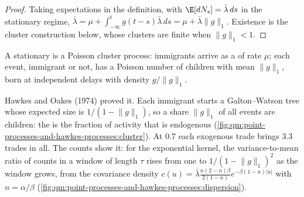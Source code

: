 \begin{proof}
Taking expectations in the definition, with $\E[dN_s] = \bar\lambda\,ds$ in the stationary regime,
$\bar\lambda = \mu + \int_{-\infty}^t g(t - s)\bar\lambda\,ds = \mu + \bar\lambda\lVert g\rVert_1$. Existence is the
cluster construction below, whose clusters are finite when $\lVert g\rVert_1 < 1$.
\end{proof}

\begin{theorem}\label{thm:qm:point-processes-and-hawkes-processes:cluster}
A stationary  is a Poisson cluster process: immigrants arrive as a  of rate
$\mu$; each event, immigrant or not, has a Poisson number of children with mean $\lVert g\rVert_1$, born at
independent delays with density $g/\lVert g\rVert_1$.
\end{theorem}

\admitted

Hawkes and Oakes (1974) proved it. Each immigrant starts a Galton--Watson tree whose expected size is
$1/(1 - \lVert g\rVert_1)$, so a share $\lVert g\rVert_1$ of all events are children: the  is the
fraction of activity that is endogenous (\cref{fig:qm:point-processes-and-hawkes-processes:cluster}). At
0.7 each exogenous trade brings 3.3 trades in all. The counts show it: for the exponential kernel, the
variance-to-mean ratio of counts in a window of length $\tau$ rises from one to $1/(1 - \lVert g\rVert_1)^2$ as the
window grows, from the covariance density $c(u) = \bar\lambda\frac{n(2-n)\beta}{2(1-n)}e^{-\beta(1-n)|u|}$ with $n =
\alpha/\beta$ (\cref{fig:qm:point-processes-and-hawkes-processes:dispersion}).

